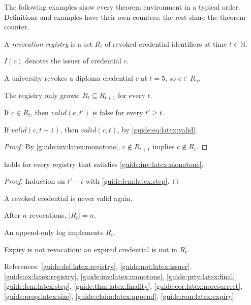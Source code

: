 The following examples show every theorem environment in a typical order.
Definitions and examples have their own counters; the rest share the theorem counter.
\begin{definition}\label{guide:def:latex:registry}
A \emph{revocation registry} is a set $R_t$ of revoked credential identifiers at time $t \in \mathbb{N}$.
\end{definition}
\begin{notation}\label{guide:not:latex:issuer}
$I(c)$ denotes the issuer of credential $c$.
\end{notation}
\begin{example}\label{guide:ex:latex:registry}
A university revokes a diploma credential $c$ at $t=5$, so $c \in R_5$.
\end{example}
\begin{invariant}\label{guide:inv:latex:monotone}
The registry only grows: $R_t \subseteq R_{t+1}$ for every $t$.
\end{invariant}
\begin{property}\label{guide:prty:latex:final}
If $c \in R_t$, then $\mathit{valid}(c, t')$ is false for every $t' \geq t$.
\end{property}
\begin{lemma}\label{guide:lem:latex:step}
If $\mathit{valid}(c, t+1)$, then $\mathit{valid}(c, t)$, by \cref{guide:eq:latex:valid}.
\end{lemma}
\begin{proof}
By \cref{guide:inv:latex:monotone}, $c \notin R_{t+1}$ implies $c \notin R_t$.
\end{proof}
\begin{theorem}[Finality]\label{guide:thm:latex:finality}
 holds for every registry that satisfies \cref{guide:inv:latex:monotone}.
\end{theorem}
\begin{proof}
Induction on $t' - t$ with \cref{guide:lem:latex:step}.
\end{proof}
\begin{corollary}\label{guide:cor:latex:noresurrect}
A revoked credential is never valid again.
\end{corollary}
\begin{proposition}\label{guide:prop:latex:size}
After $n$ revocations, $|R_t| = n$.
\end{proposition}
\begin{claim}\label{guide:claim:latex:append}
An append-only log implements $R_t$.
\end{claim}
\begin{remark}\label{guide:rem:latex:expiry}
Expiry is not revocation: an expired credential is not in $R_t$.
\end{remark}
References: \cref{guide:def:latex:registry}, \cref{guide:not:latex:issuer}, \cref{guide:ex:latex:registry}, \cref{guide:inv:latex:monotone}, \cref{guide:prty:latex:final}, \cref{guide:lem:latex:step}, \cref{guide:thm:latex:finality}, \cref{guide:cor:latex:noresurrect}, \cref{guide:prop:latex:size}, \cref{guide:claim:latex:append}, \cref{guide:rem:latex:expiry}.

